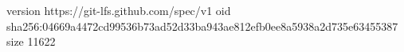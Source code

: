 version https://git-lfs.github.com/spec/v1
oid sha256:04669a4472cd99536b73ad52d33ba943ae812efb0ee8a5938a2d735e63455387
size 11622
